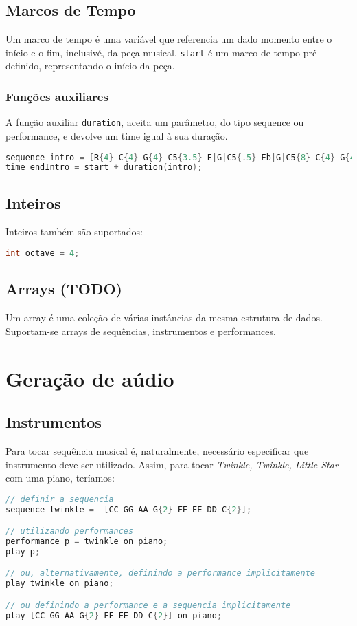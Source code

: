 \documentclass{article}
\begin{document}
\subsection{Marcos de Tempo}
Um marco de tempo é uma variável que referencia um dado momento entre o início e o fim, inclusivé, da peça musical. \texttt{start} é um marco de tempo pré-definido, representando o início da peça. 
\subsubsection{Funções auxiliares}
A função auxiliar \texttt{duration}, aceita um parâmetro, do tipo sequence ou performance, e devolve um time igual à sua duração.
\begin{lstlisting}[language=C]
sequence intro = [R{4} C{4} G{4} C5{3.5} E|G|C5{.5} Eb|G|C5{8} C{4} G{4}]; // Strauss - Also Sprach Zarathustra - Intro (https://www.8notes.com/scores/7213.asp)
time endIntro = start + duration(intro);
\end{lstlisting}

\subsection{Inteiros}
Inteiros também são suportados:
\begin{lstlisting}[language=C]
int octave = 4;
\end{lstlisting}

\subsection{Arrays (TODO)}
Um array é uma coleção de várias instâncias da mesma estrutura de dados. Suportam-se arrays de sequências, instrumentos e performances.

\section{Geração de aúdio} \label{audio}
\subsection{Instrumentos}
Para tocar sequência musical é, naturalmente, necessário especificar que instrumento deve ser utilizado. Assim, para tocar \textit{Twinkle, Twinkle, Little Star} com uma piano, teríamos:
\begin{lstlisting}[language=C]
// definir a sequencia
sequence twinkle =  [CC GG AA G{2} FF EE DD C{2}];

// utilizando performances
performance p = twinkle on piano;
play p;

// ou, alternativamente, definindo a performance implicitamente
play twinkle on piano;

// ou definindo a performance e a sequencia implicitamente
play [CC GG AA G{2} FF EE DD C{2}] on piano;
\end{lstlisting}
\end{document}
